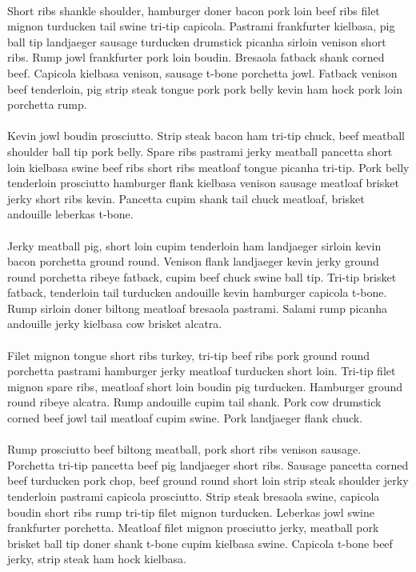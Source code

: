 \paragraph{}
Short ribs shankle shoulder, hamburger doner bacon pork loin beef ribs filet mignon turducken tail swine tri-tip capicola. Pastrami frankfurter kielbasa, pig ball tip landjaeger sausage turducken drumstick picanha sirloin venison short ribs. Rump jowl frankfurter pork loin boudin. Bresaola fatback shank corned beef. Capicola kielbasa venison, sausage t-bone porchetta jowl. Fatback venison beef tenderloin, pig strip steak tongue pork pork belly kevin ham hock pork loin porchetta rump.

\paragraph{}
Kevin jowl boudin prosciutto. Strip steak bacon ham tri-tip chuck, beef meatball shoulder ball tip pork belly. Spare ribs pastrami jerky meatball pancetta short loin kielbasa swine beef ribs short ribs meatloaf tongue picanha tri-tip. Pork belly tenderloin prosciutto hamburger flank kielbasa venison sausage meatloaf brisket jerky short ribs kevin. Pancetta cupim shank tail chuck meatloaf, brisket andouille leberkas t-bone.

\paragraph{}
Jerky meatball pig, short loin cupim tenderloin ham landjaeger sirloin kevin bacon porchetta ground round. Venison flank landjaeger kevin jerky ground round porchetta ribeye fatback, cupim beef chuck swine ball tip. Tri-tip brisket fatback, tenderloin tail turducken andouille kevin hamburger capicola t-bone. Rump sirloin doner biltong meatloaf bresaola pastrami. Salami rump picanha andouille jerky kielbasa cow brisket alcatra.

\paragraph{}
Filet mignon tongue short ribs turkey, tri-tip beef ribs pork ground round porchetta pastrami hamburger jerky meatloaf turducken short loin. Tri-tip filet mignon spare ribs, meatloaf short loin boudin pig turducken. Hamburger ground round ribeye alcatra. Rump andouille cupim tail shank. Pork cow drumstick corned beef jowl tail meatloaf cupim swine. Pork landjaeger flank chuck.

\paragraph{}
Rump prosciutto beef biltong meatball, pork short ribs venison sausage. Porchetta tri-tip pancetta beef pig landjaeger short ribs. Sausage pancetta corned beef turducken pork chop, beef ground round short loin strip steak shoulder jerky tenderloin pastrami capicola prosciutto. Strip steak bresaola swine, capicola boudin short ribs rump tri-tip filet mignon turducken. Leberkas jowl swine frankfurter porchetta. Meatloaf filet mignon prosciutto jerky, meatball pork brisket ball tip doner shank t-bone cupim kielbasa swine. Capicola t-bone beef jerky, strip steak ham hock kielbasa.

